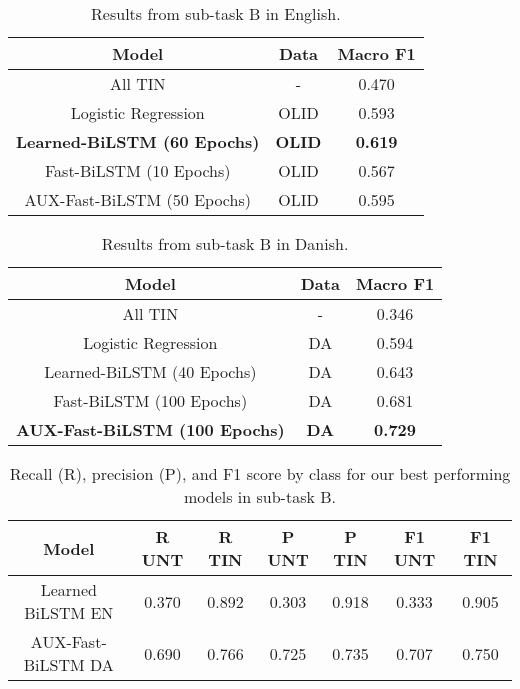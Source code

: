 \documentclass{article}
\begin{document}
\begin{table}
\centering
\small
\caption{Results from sub-task B in English.}\label{table:subBEN}
\begin{tabular}{c|c|c}
\textbf{Model}                      & \textbf{Data} & \textbf{Macro F1} \\\hline
All TIN                             & -                  & 0.470             \\
Logistic Regression                 & OLID               & 0.593             \\
\textbf{Learned-BiLSTM (60 Epochs)} & \textbf{OLID}      & \textbf{0.619}    \\
Fast-BiLSTM (10 Epochs)             & OLID               & 0.567             \\
AUX-Fast-BiLSTM (50 Epochs)         & OLID               & 0.595             \\
\end{tabular}
\end{table}

\begin{table}
\small
\centering
\caption{Results from  sub-task B in Danish.}\label{table:subBDA}
\begin{tabular}{c|c|c}
\textbf{Model}                        & \textbf{Data} & \textbf{Macro F1} \\\hline
All TIN                               & -                  & 0.346             \\
Logistic Regression                   & DA                 & 0.594             \\
Learned-BiLSTM (40 Epochs)            & DA                 & 0.643             \\
Fast-BiLSTM (100 Epochs)              & DA                 & 0.681             \\
\textbf{AUX-Fast-BiLSTM (100 Epochs)} & \textbf{DA}        & \textbf{0.729}    \\
\end{tabular}
\end{table}

\begin{table*}
\centering
\small
\caption{Recall (R), precision (P), and F1 score by class for our best performing models in sub-task B. 
}
\begin{tabular}{c|c|c|c|c|c|c}
\textbf{Model}                         &\textbf{ R UNT }         &\textbf{ R TIN}          & \textbf{P UNT }         & \textbf{P TIN}          & \textbf{F1 UNT}         & \textbf{F1 TIN }        \\\hline
Learned BiLSTM EN & 0.370 & 0.892 & 0.303 & 0.918 & 0.333 & 0.905 \\
AUX-Fast-BiLSTM DA& 0.690 & 0.766 & 0.725 & 0.735 & 0.707 & 0.750\\
\end{tabular}
\label{table:subBBest}
\end{table*}
\end{document}
